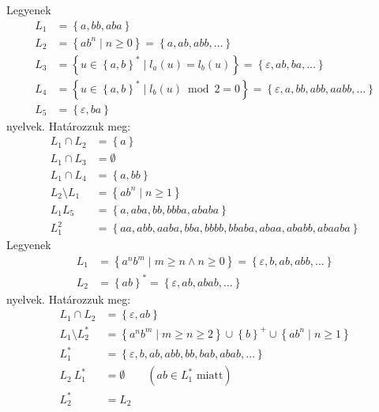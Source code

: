 \subsubsection{}
Legyenek
\begin{align*}
	L_1 &= \left\lbrace a, bb, aba \right\rbrace \\
	L_2 &= \left\lbrace ab^n \; | \; n \ge 0 \right\rbrace = \left\lbrace a, ab, abb, \dots \right\rbrace  \\
	L_3 &= \left\lbrace u \in \left\lbrace a,b \right\rbrace ^* \; | \; l_a(u) = l_b(u) \right\rbrace
	= \left\lbrace \varepsilon, ab, ba, \dots \right\rbrace  \\
	L_4 &= \left\lbrace u \in \left\lbrace a,b \right\rbrace ^* \; | \; l_b(u) \bmod 2  = 0 \right\rbrace
	= \left\lbrace \varepsilon, a, bb, abb, aabb, \dots \right\rbrace \\
	L_5 &= \left\lbrace \varepsilon, ba \right\rbrace
\end{align*}
nyelvek. Határozzuk meg:
\begin{align*}
	L_1 \cap L_2 &= \left\lbrace a \right\rbrace \\
	L_1 \cap L_3 &= \emptyset \\
	L_1 \cap L_4 &= \left\lbrace a, bb \right\rbrace \\
	L_2 \setminus L_1 &= \left\lbrace ab^n \; | \; n \ge 1 \right\rbrace \\
	L_1L_5 &= \left\lbrace a, aba, bb, bbba, ababa \right\rbrace \\
	L_1^2 &= \left\lbrace aa, abb, aaba, bba, bbbb, bbaba, abaa, ababb, abaaba \right\rbrace 
\end{align*}
Legyenek
\begin{align*}
	L_1 &= \left\lbrace a^nb^m \; | \; m \ge n \land n \ge 0 \right\rbrace = \left\lbrace \varepsilon, b, ab, abb, \dots \right\rbrace  \\
	L_2 &= \left\lbrace ab \right\rbrace^* = \left\lbrace \varepsilon, ab, abab, \dots \right\rbrace 
\end{align*}
nyelvek. Határozzuk meg:
\begin{align*}
	L_1 \cap L_2 &= \left\lbrace \varepsilon, ab \right\rbrace \\
	L_1 \setminus L_2^* &= \left\lbrace a^nb^m \; | \; m \ge n \ge 2 \right\rbrace \cup \left\lbrace b \right\rbrace^+ \cup \left\lbrace ab^n \; | \; n \ge 1 \right\rbrace \\
	L_1^* &= \left\lbrace \varepsilon, b, ab, abb, bb, bab, abab, \dots \right\rbrace \\
	L_2 \ L_1^* &= \emptyset \qquad (ab \in L_1^* \text{ miatt}) \\
	L_2^* &= L_2
\end{align*}